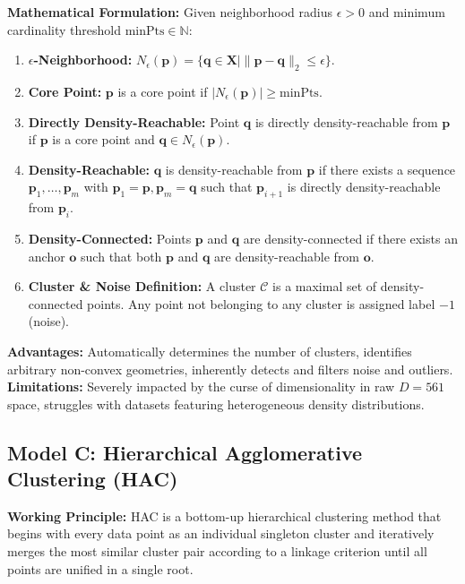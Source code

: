 \documentclass[12pt,a4paper]{article}
\begin{document}
\textbf{Mathematical Formulation:}
Given neighborhood radius $\epsilon > 0$ and minimum cardinality threshold $\text{minPts} \in \mathbb{N}$:
\begin{enumerate}[noitemsep]
    \item \textbf{$\epsilon$-Neighborhood:} $N_\epsilon(\mathbf{p}) = \{\mathbf{q} \in \mathbf{X} \mid \|\mathbf{p} - \mathbf{q}\|_2 \le \epsilon\}$.
    \item \textbf{Core Point:} $\mathbf{p}$ is a core point if $|N_\epsilon(\mathbf{p})| \ge \text{minPts}$.
    \item \textbf{Directly Density-Reachable:} Point $\mathbf{q}$ is directly density-reachable from $\mathbf{p}$ if $\mathbf{p}$ is a core point and $\mathbf{q} \in N_\epsilon(\mathbf{p})$.
    \item \textbf{Density-Reachable:} $\mathbf{q}$ is density-reachable from $\mathbf{p}$ if there exists a sequence $\mathbf{p}_1, \dots, \mathbf{p}_m$ with $\mathbf{p}_1 = \mathbf{p}, \mathbf{p}_m = \mathbf{q}$ such that $\mathbf{p}_{i+1}$ is directly density-reachable from $\mathbf{p}_i$.
    \item \textbf{Density-Connected:} Points $\mathbf{p}$ and $\mathbf{q}$ are density-connected if there exists an anchor $\mathbf{o}$ such that both $\mathbf{p}$ and $\mathbf{q}$ are density-reachable from $\mathbf{o}$.
    \item \textbf{Cluster \& Noise Definition:} A cluster $\mathcal{C}$ is a maximal set of density-connected points. Any point not belonging to any cluster is assigned label $-1$ (noise).
\end{enumerate}
\textbf{Advantages:} Automatically determines the number of clusters, identifies arbitrary non-convex geometries, inherently detects and filters noise and outliers. \\
\textbf{Limitations:} Severely impacted by the curse of dimensionality in raw $D=561$ space, struggles with datasets featuring heterogeneous density distributions.

\subsection{Model C: Hierarchical Agglomerative Clustering (HAC)}
\textbf{Working Principle:} HAC is a bottom-up hierarchical clustering method that begins with every data point as an individual singleton cluster and iteratively merges the most similar cluster pair according to a linkage criterion until all points are unified in a single root.
\end{document}
